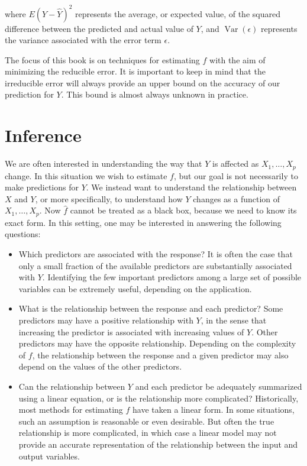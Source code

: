 \documentclass[10pt]{article}
\begin{document}
where $E(Y-\hat{Y})^{2}$ represents the average, or expected value, of the squared difference between the predicted and actual value of $Y$, and $\operatorname{Var}(\epsilon)$ represents the variance associated with the error term $\epsilon$.

The focus of this book is on techniques for estimating $f$ with the aim of minimizing the reducible error. It is important to keep in mind that the irreducible error will always provide an upper bound on the accuracy of our prediction for $Y$. This bound is almost always unknown in practice.

\section*{Inference}
We are often interested in understanding the way that $Y$ is affected as $X_{1}, \ldots, X_{p}$ change. In this situation we wish to estimate $f$, but our goal is not necessarily to make predictions for $Y$. We instead want to understand the relationship between $X$ and $Y$, or more specifically, to understand how $Y$ changes as a function of $X_{1}, \ldots, X_{p}$. Now $\hat{f}$ cannot be treated as a black box, because we need to know its exact form. In this setting, one may be interested in answering the following questions:

\begin{itemize}
  \item Which predictors are associated with the response? It is often the case that only a small fraction of the available predictors are substantially associated with $Y$. Identifying the few important predictors among a large set of possible variables can be extremely useful, depending on the application.
  \item What is the relationship between the response and each predictor? Some predictors may have a positive relationship with $Y$, in the sense that increasing the predictor is associated with increasing values of $Y$. Other predictors may have the opposite relationship. Depending on the complexity of $f$, the relationship between the response and a given predictor may also depend on the values of the other predictors.
  \item Can the relationship between $Y$ and each predictor be adequately summarized using a linear equation, or is the relationship more complicated? Historically, most methods for estimating $f$ have taken a linear form. In some situations, such an assumption is reasonable or even desirable. But often the true relationship is more complicated, in which case a linear model may not provide an accurate representation of the relationship between the input and output variables.
\end{itemize}
\end{document}
